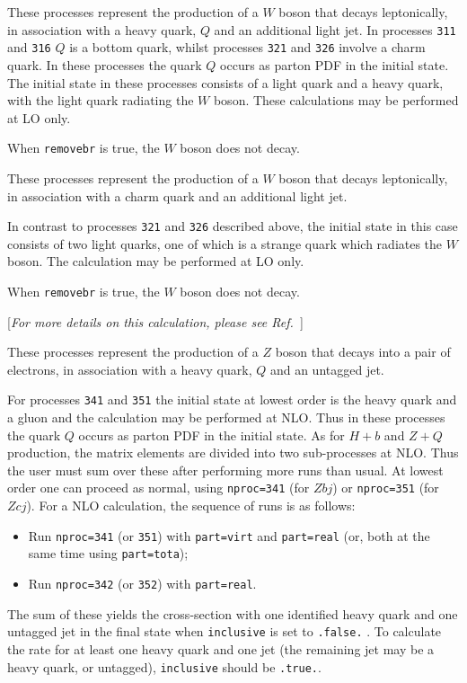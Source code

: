 \label{subsec:wQj}

These processes represent the production of a $W$
boson that decays leptonically,
in association with a heavy quark, $Q$ and an additional light jet. In
processes {\tt 311} and {\tt 316} $Q$ is a bottom quark, whilst
processes {\tt 321} and {\tt 326} involve a charm quark.
In these processes the quark $Q$ occurs as parton PDF in the initial state. 
The initial state in these processes consists of a light quark and a heavy 
quark, with the light quark radiating the $W$ boson. These calculations may
be performed at LO only.

When {\tt removebr} is true, the $W$ boson does not decay.

\label{subsec:wcj}

These processes represent the production of a $W$
boson that decays leptonically,
in association with a charm quark and an additional light jet. 

In contrast to processes {\tt 321} and {\tt 326} described above, the initial
state in this case consists of two light quarks, one of which is a
strange quark which radiates the $W$ boson. The calculation may
be performed at LO only.

When {\tt removebr} is true, the $W$ boson does not decay.

\label{subsec:ZQj}

\begin{center}
[{\it For more details on this calculation, please see Ref.~\cite{Campbell:2005zv}}]
\end{center}

These processes represent the production of a $Z$
boson that decays into a pair of electrons,
in association with a heavy quark, $Q$ and an untagged jet.

For processes {\tt 341} and {\tt 351} the initial state at lowest
order is the heavy quark and a gluon and the calculation may be
performed at NLO.  Thus in these processes the quark $Q$ occurs as
parton PDF in the initial state.  As for $H+b$ and $Z+Q$ production,
the matrix elements are divided into two sub-processes at NLO. Thus
the user must sum over these after performing more runs than usual. At
lowest order one can proceed as normal, using {\tt nproc=341} (for
$Zbj$) or {\tt nproc=351} (for $Zcj$).  For a NLO calculation, the
sequence of runs is as follows:
\begin{itemize}
\item Run {\tt nproc=341} (or {\tt 351}) with {\tt part=virt} and
{\tt part=real} (or, both at the same time using {\tt part=tota});
\item Run {\tt nproc=342} (or {\tt 352}) with {\tt part=real}.
\end{itemize}
The sum of these yields the cross-section with one identified heavy
quark and one untagged jet in the final state when {\tt inclusive} is
set to {\tt .false.} . To calculate the rate for at least one heavy
quark and one jet (the remaining jet may be a heavy quark, or
untagged), {\tt inclusive} should be {\tt .true.}.

